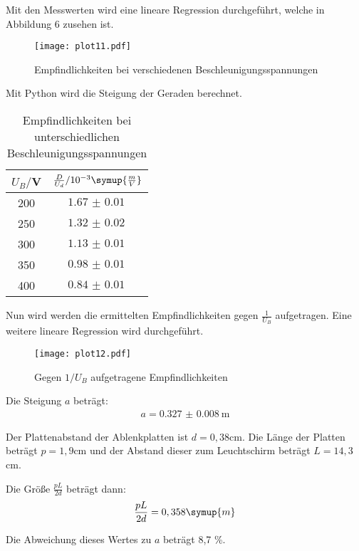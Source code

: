 Mit den Messwerten wird eine lineare Regression durchgeführt, welche in Abbildung 6 zusehen ist.

\begin{figure}
  \centering
  \texttt{[image: plot11.pdf]}
  \caption{Empfindlichkeiten bei verschiedenen Beschleunigungsspannungen}
  \label{fig:plot}
\end{figure}

Mit Python wird die Steigung der Geraden berechnet. \\

\begin{table}[H]
  \centering
  \caption{Empfindlichkeiten bei unterschiedlichen Beschleunigungsspannungen}
  \label{tab:Spannungsamplitude}
  \begin{tabular}{c c}
    \toprule
    $U_B/$V & $\frac{D}{U_d} / 10^{-3}\symup{\frac{m}{V}}$ \\
    \midrule
    200 & $\SI{1.67(1)}{}$ \\
    250 & $\SI{1.32(2)}{}$ \\
    300 & $\SI{1.13(1)}{}$ \\
    350 & $\SI{0.98(1)}{}$ \\
    400 & $\SI{0.84(1)}{}$ \\
    \bottomrule
  \end{tabular}
\end{table}


Nun wird werden die ermittelten Empfindlichkeiten gegen $\frac{1}{U_B}$ aufgetragen. Eine weitere
lineare Regression wird durchgeführt.

\begin{figure}
  \centering
  \texttt{[image: plot12.pdf]}
  \caption{Gegen $1/U_B$ aufgetragene Empfindlichkeiten}
  \label{fig:plot}
\end{figure}

Die Steigung $a$ beträgt:
\begin{align*}
  a = \SI{0.327(8)}{\meter}
\end{align*}

Der Plattenabstand der Ablenkplatten ist $d = 0,38$cm. Die Länge der Platten beträgt $p= 1,9$cm und der
Abstand dieser zum Leuchtschirm beträgt $L = 14,3$cm.

Die Größe $\frac{pL}{2d}$ beträgt dann:
\begin{equation*}
  \frac{pL}{2d} = 0,358 \symup{m}
\end{equation*}

Die Abweichung dieses Wertes zu $a$ beträgt 8,7 \%.

